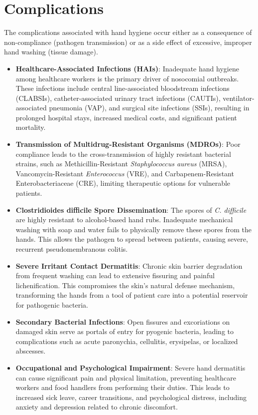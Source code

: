 \section*{Complications}
The complications associated with hand hygiene occur either as a consequence of non-compliance (pathogen transmission) or as a side effect of excessive, improper hand washing (tissue damage).
\begin{itemize}
    \item \textbf{Healthcare-Associated Infections (HAIs)}: Inadequate hand hygiene among healthcare workers is the primary driver of nosocomial outbreaks. These infections include central line-associated bloodstream infections (CLABSIs), catheter-associated urinary tract infections (CAUTIs), ventilator-associated pneumonia (VAP), and surgical site infections (SSIs), resulting in prolonged hospital stays, increased medical costs, and significant patient mortality.
    \item \textbf{Transmission of Multidrug-Resistant Organisms (MDROs)}: Poor compliance leads to the cross-transmission of highly resistant bacterial strains, such as Methicillin-Resistant \textit{Staphylococcus aureus} (MRSA), Vancomycin-Resistant \textit{Enterococcus} (VRE), and Carbapenem-Resistant Enterobacteriaceae (CRE), limiting therapeutic options for vulnerable patients.
    \item \textbf{Clostridioides difficile Spore Dissemination}: The spores of \textit{C. difficile} are highly resistant to alcohol-based hand rubs. Inadequate mechanical washing with soap and water fails to physically remove these spores from the hands. This allows the pathogen to spread between patients, causing severe, recurrent pseudomembranous colitis.
    \item \textbf{Severe Irritant Contact Dermatitis}: Chronic skin barrier degradation from frequent washing can lead to extensive fissuring and painful lichenification. This compromises the skin's natural defense mechanism, transforming the hands from a tool of patient care into a potential reservoir for pathogenic bacteria.
    \item \textbf{Secondary Bacterial Infections}: Open fissures and excoriations on damaged skin serve as portals of entry for pyogenic bacteria, leading to complications such as acute paronychia, cellulitis, erysipelas, or localized abscesses.
    \item \textbf{Occupational and Psychological Impairment}: Severe hand dermatitis can cause significant pain and physical limitation, preventing healthcare workers and food handlers from performing their duties. This leads to increased sick leave, career transitions, and psychological distress, including anxiety and depression related to chronic discomfort.
\end{itemize}

